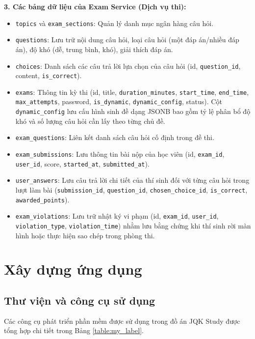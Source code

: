\documentclass[../DoAn.tex]{subfiles}
\begin{document}
\textbf{3. Các bảng dữ liệu của Exam Service (Dịch vụ thi):}
\begin{itemize}
    \item \texttt{topics} và \texttt{exam\_sections}: Quản lý danh mục ngân hàng câu hỏi.
    \item \texttt{questions}: Lưu trữ nội dung câu hỏi, loại câu hỏi (một đáp án/nhiều đáp án), độ khó (dễ, trung bình, khó), giải thích đáp án.
    \item \texttt{choices}: Danh sách các câu trả lời lựa chọn của câu hỏi (id, \texttt{question\_id}, content, \texttt{is\_correct}).
    \item \texttt{exams}: Thông tin kỳ thi (id, title, \texttt{duration\_minutes}, \texttt{start\_time}, \texttt{end\_time}, \texttt{max\_attempts}, password, \texttt{is\_dynamic}, \texttt{dynamic\_config}, status). Cột \texttt{dynamic\_config} lưu cấu hình sinh đề dạng JSONB bao gồm tỷ lệ phân bổ độ khó và số lượng câu hỏi cần lấy theo từng chủ đề.
    \item \texttt{exam\_questions}: Liên kết danh sách câu hỏi cố định trong đề thi.
    \item \texttt{exam\_submissions}: Lưu thông tin bài nộp của học viên (id, \texttt{exam\_id}, \texttt{user\_id}, score, \texttt{started\_at}, \texttt{submitted\_at}).
    \item \texttt{user\_answers}: Lưu câu trả lời chi tiết của thí sinh đối với từng câu hỏi trong lượt làm bài (\texttt{submission\_id}, \texttt{question\_id}, \texttt{chosen\_choice\_id}, \texttt{is\_correct}, \texttt{awarded\_points}).
    \item \texttt{exam\_violations}: Lưu trữ nhật ký vi phạm (id, \texttt{exam\_id}, \texttt{user\_id}, \texttt{violation\_type}, \texttt{violation\_time}) nhằm lưu bằng chứng khi thí sinh rời màn hình hoặc thực hiện sao chép trong phòng thi.
\end{itemize}

\section{Xây dựng ứng dụng}
\label{section:4.3}

\subsection{Thư viện và công cụ sử dụng}
Các công cụ phát triển phần mềm được sử dụng trong đồ án JQK Study được tổng hợp chi tiết trong Bảng \ref{table:my_label}.
\end{document}
